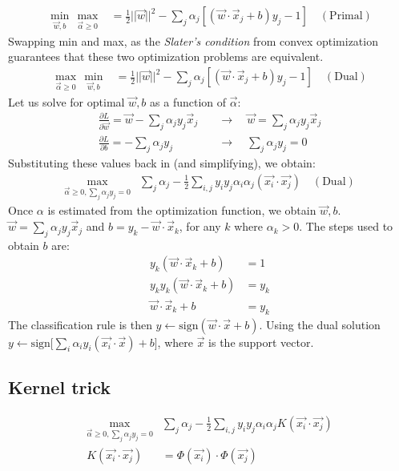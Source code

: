 \documentclass{book}
\begin{document}
\begin{align*}
\min_{\vec{w},b} \, \max_{\vec{\alpha}\geq0} &= \frac{1}{2}||\vec{w}||^2 - \sum_j \alpha_j [(\vec{w} \cdot \vec{x}_j + b)y_j - 1] \quad \mathrm{(Primal)}
\end{align*}
Swapping min and max, as the \emph{Slater's condition} from convex optimization guarantees that these two optimization problems are equivalent.
\begin{align*}
\max_{\vec{\alpha}\geq0} \, \min_{\vec{w},b} &= \frac{1}{2}||\vec{w}||^2 - \sum_j \alpha_j [(\vec{w} \cdot \vec{x}_j + b)y_j - 1] \quad \mathrm{(Dual)}
\end{align*}
Let us solve for optimal $\vec{w}, b$ as a function of $\vec{\alpha}$: 
\begin{align*}
\frac{\partial L}{\partial \vec{w}} = \vec{w} - \sum_j \alpha_j y_j \vec{x}_j \quad & \rightarrow \quad \vec{w} = \sum_j \alpha_j y_j \vec{x}_j \\
\frac{\partial L}{\partial b} = - \sum_j \alpha_j y_j \quad & \rightarrow \quad \sum_j \alpha_j y_j = 0
\end{align*}
Substituting these values back in (and simplifying), we obtain: 
\begin{align*}
\max_{\vec{\alpha}\geq0, \sum_j \alpha_j y_j = 0} & \sum_j \alpha_j - \frac{1}{2} \sum_{i,j} y_iy_j\alpha_i\alpha_j (\vec{x_i}\cdot \vec{x_j}) \quad \mathrm{(Dual)}
\end{align*}
Once $\alpha$ is estimated from the optimization function, we obtain $\vec{w}, b$.
$\vec{w} = \sum_j \alpha_j y_j \vec{x}_j$ and $b = y_k - \vec{w}\cdot \vec{x}_k$, for any $k$ where $\alpha_k > 0$.
The steps used to obtain $b$ are:
\begin{align*}
y_k (\vec{w}\cdot \vec{x}_k + b) &= 1 \\
y_ky_k (\vec{w}\cdot \vec{x}_k + b) &= y_k \\
\vec{w}\cdot \vec{x}_k + b &= y_k
\end{align*}
The classification rule is then $y \leftarrow \mathrm{sign} (\vec{w}\cdot\vec{x}+b)$. Using the dual solution $y \leftarrow \mathrm{sign} \big[\sum_i\alpha_iy_i(\vec{x_i}\cdot \vec{x})+b\big]$, where $\vec{x}$ is the support vector.

\subsection{Kernel trick}
\begin{align*}
\max_{\vec{\alpha}\geq0, \sum_j \alpha_j y_j = 0} & \sum_j \alpha_j - \frac{1}{2} \sum_{i,j} y_iy_j\alpha_i\alpha_j K(\vec{x_i}\cdot \vec{x_j}) \\
K(\vec{x_i}\cdot \vec{x_j}) &= \Phi (\vec{x_i}) \cdot \Phi (\vec{x_j})
\end{align*}
\end{document}
